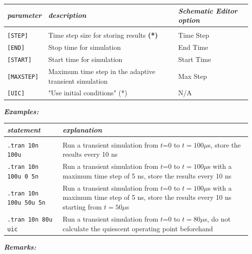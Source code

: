\begin{tabular}{lp{5.5cm}p{5cm}}
\textit{parameter} & \textit{description} & \textit{Schematic Editor option}\\ \hline \\ \vspace{-0.8\parskip}
\texttt{[STEP]} & Time step size for {storing results} \textbf{(*)} & \textsf{Time Step}\\
\texttt{[END]} & Stop time for simulation & \textsf{End Time} \\
\texttt{[START]} & Start time for simulation & \textsf{Start Time} \\
\texttt{[MAXSTEP]} & Maximum time step in the adaptive transient simulation & \textsf{Max Step} \\
\texttt{[UIC]} & "Use initial conditions" (*) & \textsf{N/A} 
\end{tabular}


\textbf{\textit{Examples:}}

\begin{tabular}{p{5cm}p{8cm}}
\textit{statement} & \textit{explanation} \\ \hline \\ \vspace{-0.8\parskip} 
\texttt{.tran 10n 100u} & {\small Run a transient simulation from $t$=0 to \newline $t=100\mu$s, store the results every 10 ns} \\
\texttt{.tran 10n 100u 0 5n} & {\small Run a transient simulation from $t$=0 to \newline $t=100\mu$s with a maximum time step of 5 ns, store the results every 10 ns} \\
\texttt{.tran 10n 100u 50u 5n} & {\small Run a transient simulation from $t$=0 to \newline $t=100\mu$s with a maximum time step of 5 ns, store the results every 10 ns \newline starting from $t=50\mu$s} \\
\texttt{.tran 10n 80u uic} & {\small Run a transient simulation from $t$=0 to \newline $t=80\mu$s, do not calculate the quiescent operating point beforehand}
\end{tabular}

\textbf{\textit{Remarks:}}

